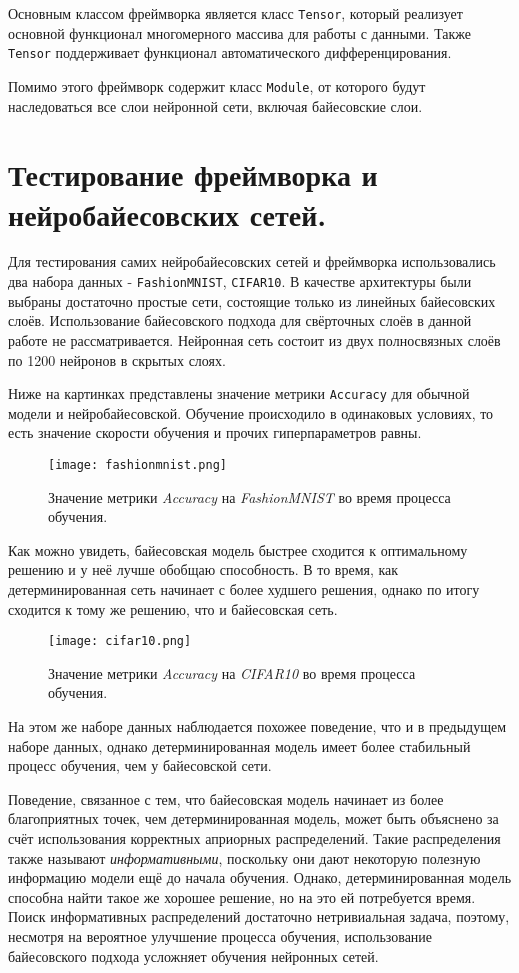 Основным классом фреймворка является класс \verb|Tensor|, который реализует основной функционал многомерного массива для работы с данными. Также \verb|Tensor|
 поддерживает функционал автоматического дифференцирования.

Помимо этого фреймворк содержит класс \verb|Module|, от которого будут наследоваться все слои нейронной сети, включая байесовские слои.

\section{Тестирование фреймворка и нейробайесовских сетей.}

Для тестирования самих нейробайесовских сетей и фреймворка использовались два набора данных - \verb|FashionMNIST|, \verb|CIFAR10|. В качестве архитектуры
 были выбраны достаточно простые сети, состоящие только из линейных байесовских слоёв. Использование байесовского подхода для свёрточных слоёв в данной работе
 не рассматривается. Нейронная сеть состоит из двух полносвязных слоёв по 1200 нейронов в скрытых слоях.

Ниже на картинках представлены значение метрики \verb|Accuracy| для обычной модели и нейробайесовской. Обучение происходило в одинаковых условиях, то есть
 значение скорости обучения и прочих гиперпараметров равны.

\begin{figure}[H]
    \centering
    \texttt{[image: fashionmnist.png]}
    \caption{Значение метрики \textit{Accuracy} на \textit{FashionMNIST} во время процесса обучения.}
    \label{fig:fashionmnist}
\end{figure}

Как можно увидеть, байесовская модель быстрее сходится к оптимальному решению и у неё лучше обобщаю способность. В то время, как детерминированная сеть начинает
 с более худшего решения, однако по итогу сходится к тому же решению, что и байесовская сеть.

\begin{figure}[H]
    \centering
    \texttt{[image: cifar10.png]}
    \caption{Значение метрики \textit{Accuracy} на \textit{CIFAR10} во время процесса обучения.}
    \label{fig:cifar10}
\end{figure}

На этом же наборе данных наблюдается похожее поведение, что и в предыдущем наборе данных, однако детерминированная модель имеет более стабильный процесс обучения, чем
 у байесовской сети.

Поведение, связанное с тем, что байесовская модель начинает из более благоприятных точек, чем детерминированная модель, может быть объяснено за счёт использования
 корректных априорных распределений. Такие распределения также называют \textit{информативными}, поскольку они дают некоторую полезную информацию модели ещё до
 начала обучения. Однако, детерминированная модель способна найти такое же хорошее решение, но на это ей потребуется время. Поиск информативных распределений
 достаточно нетривиальная задача, поэтому, несмотря на вероятное улучшение процесса обучения, использование байесовского подхода усложняет обучения нейронных сетей.
